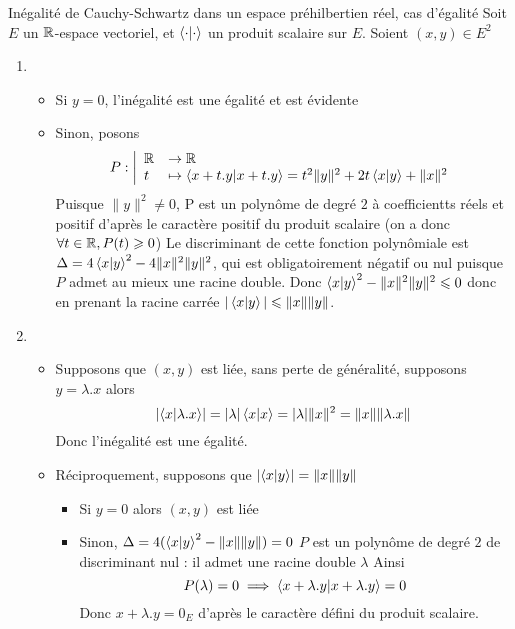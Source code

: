 \documentclass{article}
\date{22 juin 2024}
\begin{document}
\maketitle

\begin{question_kholle}{Inégalité de Cauchy-Schwartz dans un espace préhilbertien réel, cas d'égalité}
	Soit $E$ un $\mathbb R$-espace vectoriel, et $\braket{ \cdot | \cdot  }$ un produit scalaire sur $E$.
	Soient $(x, y) \in E^{2}$
	\begin{enumerate}
		\item \begin{itemize}[label=$\star$]
			\item Si $y=0$, l'inégalité est une égalité et est évidente
			\item Sinon, posons
			$$
			P:\left|\begin{array}{ll} \mathbb R &\to \mathbb R \\ t &\mapsto \braket{ x+t.y | x+t.y } = t^{2} \|y\|^{2} + 2 t \braket{ x | y }  + \|x\|^{2} \end{array}\right.
			$$
			Puisque $\|y\|^{2} \neq 0$, P est un polynôme de degré $2$ à coefficientts réels et positif d'après le caractère positif du produit scalaire (on a donc $\forall t \in \mathbb R, P(t)\geqslant 0$)
			Le discriminant de cette fonction polynômiale est $\Delta = 4 \braket{ x | y }^{2} - 4 \|x\|^{2}\|y\|^{2}$, qui est obligatoirement négatif ou nul puisque $P$ admet au mieux une racine double.
			Donc $\braket{ x | y }^{2} - \|x\|^{2}\|y\|^{2} \leqslant 0$ donc en prenant la racine carrée $|\braket{ x | y }| \leqslant \|x\|\|y\|$.
		\end{itemize}
		\item \begin{itemize}[label=$\star$]
			\item Supposons que $(x, y)$ est liée, sans perte de généralité, supposons $y = \lambda.x$ alors
			$$
			\lvert \braket{ x | \lambda.x } \rvert  = \lvert  \lambda \rvert  \braket{ x | x }  = \lvert  \lambda \rvert  \|x\|^{2} = \| x \| \| \lambda.x\|
			$$
			Donc l'inégalité est une égalité.
			
			\item Réciproquement, supposons que $\lvert  \braket{ x | y } \rvert = \| x\| \| y\|$
			\begin{itemize}
				\item Si $y = 0$ alors $(x, y)$ est liée
				\item Sinon, $\Delta = 4(\braket{ x | y }^{2} - \|x\|\|y\|) = 0$
				$P$ est un polynôme de degré $2$ de discriminant nul : il admet une racine double $\lambda$
				Ainsi
				$$
				P(\lambda) = 0 \implies \braket{ x+\lambda.y | x+\lambda.y } = 0
				$$
				Donc $x+\lambda .y = 0_{E}$ d'après le caractère défini du produit scalaire.
			\end{itemize}
		\end{itemize}
	\end{enumerate}
\end{question_kholle}
\end{document}
